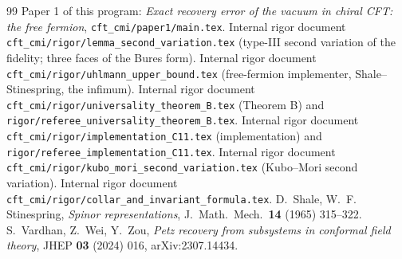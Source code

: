 \documentclass[11pt,a4paper]{article}
\theoremstyle{definition}\newtheorem{definition}[theorem]{Definition}\newtheorem{remark}[theorem]{Remark}\newtheorem{hypothesis}[theorem]{Hypothesis}
\begin{document}
\begin{thebibliography}{99}
 Paper 1 of this program: \emph{Exact recovery error of the vacuum in chiral CFT: the free
fermion}, \texttt{cft\_cmi/paper1/main.tex}.
 Internal rigor document \texttt{cft\_cmi/rigor/lemma\_second\_variation.tex} (type-III second variation of the
fidelity; three faces of the Bures form).
 Internal rigor document \texttt{cft\_cmi/rigor/uhlmann\_upper\_bound.tex} (free-fermion implementer,
Shale--Stinespring, the infimum).
 Internal rigor document \texttt{cft\_cmi/rigor/universality\_theorem\_B.tex} (Theorem B) and
\texttt{rigor/referee\_universality\_theorem\_B.tex}.
 Internal rigor document \texttt{cft\_cmi/rigor/implementation\_C11.tex} (implementation) and
\texttt{rigor/referee\_implementation\_C11.tex}.
 Internal rigor document \texttt{cft\_cmi/rigor/kubo\_mori\_second\_variation.tex} (Kubo--Mori second variation).
 Internal rigor document \texttt{cft\_cmi/rigor/collar\_and\_invariant\_formula.tex}.
 D.~Shale, W.~F. Stinespring, \emph{Spinor representations}, J.\ Math.\ Mech.\ \textbf{14}
(1965) 315--322.
 S.~Vardhan, Z.~Wei, Y.~Zou, \emph{Petz recovery from subsystems in conformal field theory},
JHEP \textbf{03} (2024) 016, arXiv:2307.14434.
\end{thebibliography}
\end{document}
